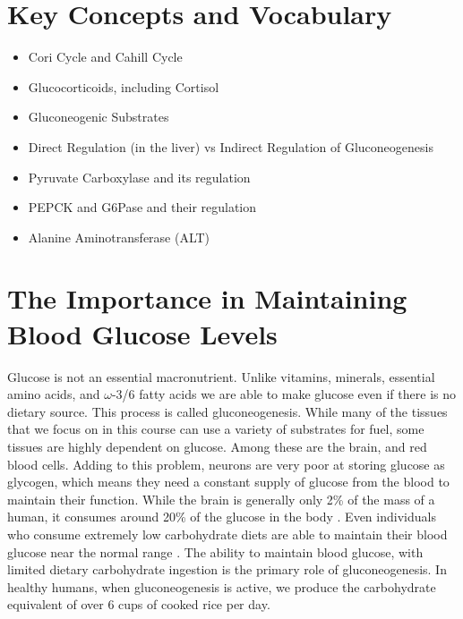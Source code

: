 \documentclass{tufte-handout}
\begin{document}
\section{Key Concepts and Vocabulary}

\begin{itemize}
	\item Cori Cycle and Cahill Cycle
	\item Glucocorticoids, including Cortisol
	\item Gluconeogenic Substrates
	\item Direct Regulation (in the liver) vs Indirect Regulation of Gluconeogenesis
	\item Pyruvate Carboxylase and its regulation
	\item PEPCK and G6Pase and their regulation
	\item Alanine Aminotransferase (ALT)
\end{itemize}

\section{The Importance in Maintaining Blood Glucose Levels}

Glucose is not an essential macronutrient.  Unlike vitamins, minerals, essential amino acids, and $\omega$-3/6 fatty acids we are able to make glucose even if there is no dietary source.  This process is called gluconeogenesis.  While many of the tissues that we focus on in this course can use a variety of substrates for fuel, some tissues are highly dependent on glucose.  Among these are the brain, and red blood cells.  Adding to this problem, neurons are very poor at storing glucose as glycogen, which means they need a constant supply of glucose from the blood to maintain their function.  While the brain is generally only 2\% of the mass of a human, it consumes around 20\% of the glucose in the body \citep{Erbsloh1958}.  Even individuals who consume extremely low carbohydrate diets are able to maintain their blood glucose near the normal range \citep{Bueno2013}.  The ability to maintain blood glucose, with limited dietary carbohydrate ingestion is the primary role of gluconeogenesis.  In healthy humans, when gluconeogenesis is active, we produce the carbohydrate equivalent of over 6 cups of cooked rice per day.  
\end{document}
